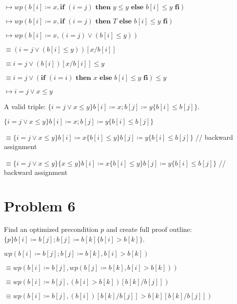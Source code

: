 \documentclass{article}
\begin{document}
\qquad \qquad $ \mapsto wp(b[i] \coloneqq x, \textbf{if } (i=j) \textbf{ then } y \leq y \textbf{ else } b[i] \leq y \textbf{ fi})$

\qquad \qquad $ \mapsto wp(b[i] \coloneqq x, \textbf{if } (i=j) \textbf{ then } T \textbf{ else } b[i] \leq y \textbf{ fi})$

\qquad \qquad $ \mapsto wp(b[i] \coloneqq x, (i=j) \vee (b[i] \leq y))$

\qquad \qquad $ \equiv (i=j \vee (b[i] \leq y))[x/ b[i]]$

\qquad \qquad $ \equiv i=j \vee (b[i])[x/ b[i]] \leq y$

\qquad \qquad $ \equiv i=j \vee (\textbf{if } (i=i) \textbf{ then } x \textbf{ else } b[i] \leq y \textbf{ fi}) \leq y$

\qquad \qquad $ \mapsto i=j \vee x \leq y$

\vspace{10pt}

A valid triple: $ \{i=j \vee x \leq y\}b[i] \coloneqq x;b[j] \coloneqq y \{b[i] \leq b[j]\}$.

\vspace{10pt}

$ \{i=j \vee x \leq y\}b[i] \coloneqq x;b[j] \coloneqq y \{b[i] \leq b[j]\}$

\qquad \qquad $ \equiv \{i=j \vee x \leq y\}b[i] \coloneqq x \{b[i] \leq y\} b[j] \coloneqq y \{b[i] \leq b[j]\}$ \qquad \qquad // backward assignment

\qquad \qquad $ \equiv \{i=j \vee x \leq y\}\{x \leq y\} b[i] \coloneqq x \{b[i] \leq y\} b[j] \coloneqq y \{b[i] \leq b[j]\}$ \qquad // backward assignment

\section*{Problem 6}

Find an optimized precondition $p$ and create full proof outline: $\{p\}b[i] \coloneqq b[j];b[j] \coloneqq b[k] \{b[i] > b[k]\}$.

\vspace{10pt}

$ wp(b[i] \coloneqq b[j];b[j] \coloneqq b[k] , b[i] > b[k]) $

\qquad \qquad $ \equiv wp(b[i] \coloneqq b[j], wp(b[j] \coloneqq b[k],b[i] > b[k]))$

\qquad \qquad $ \equiv wp(b[i] \coloneqq b[j], (b[i] > b[k])[b[k]/b[j]])$

\qquad \qquad $ \equiv wp(b[i] \coloneqq b[j], (b[i])[b[k]/b[j]] > b[k][b[k]/b[j]])$
\end{document}
